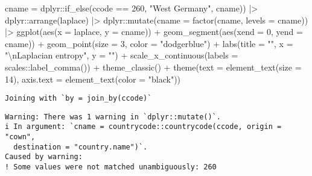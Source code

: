 \documentclass[
  12,
  letterpaper,
  DIV=11,
  numbers=noendperiod]{scrartcl}
\newenvironment{Shaded}{\begin{snugshade}}{\end{snugshade}}
\newcommand{\AttributeTok}[1]{\textcolor[rgb]{0.40,0.45,0.13}{#1}}
\newcommand{\DecValTok}[1]{\textcolor[rgb]{0.68,0.00,0.00}{#1}}
\newcommand{\FunctionTok}[1]{\textcolor[rgb]{0.28,0.35,0.67}{#1}}
\newcommand{\NormalTok}[1]{\textcolor[rgb]{0.00,0.23,0.31}{#1}}
\newcommand{\SpecialCharTok}[1]{\textcolor[rgb]{0.37,0.37,0.37}{#1}}
\newcommand{\StringTok}[1]{\textcolor[rgb]{0.13,0.47,0.30}{#1}}
\begin{document}
\begin{Shaded}
\begin{Highlighting}[numbers=left,,]
                \AttributeTok{cname =}\NormalTok{ dplyr}\SpecialCharTok{::}\FunctionTok{if\_else}\NormalTok{(ccode }\SpecialCharTok{==} \DecValTok{260}\NormalTok{, }\StringTok{"West Germany"}\NormalTok{, cname)) }\SpecialCharTok{|\textgreater{}}
\NormalTok{  dplyr}\SpecialCharTok{::}\FunctionTok{arrange}\NormalTok{(laplace) }\SpecialCharTok{|\textgreater{}}
\NormalTok{  dplyr}\SpecialCharTok{::}\FunctionTok{mutate}\NormalTok{(}\AttributeTok{cname =} \FunctionTok{factor}\NormalTok{(cname, }\AttributeTok{levels =}\NormalTok{ cname)) }\SpecialCharTok{|\textgreater{}}
  \FunctionTok{ggplot}\NormalTok{(}\FunctionTok{aes}\NormalTok{(}\AttributeTok{x =}\NormalTok{ laplace,}
             \AttributeTok{y =}\NormalTok{ cname)) }\SpecialCharTok{+}
  \FunctionTok{geom\_segment}\NormalTok{(}\FunctionTok{aes}\NormalTok{(}\AttributeTok{xend =} \DecValTok{0}\NormalTok{, }\AttributeTok{yend =}\NormalTok{ cname)) }\SpecialCharTok{+}
  \FunctionTok{geom\_point}\NormalTok{(}\AttributeTok{size =} \DecValTok{3}\NormalTok{, }\AttributeTok{color =} \StringTok{"dodgerblue"}\NormalTok{) }\SpecialCharTok{+}
  \FunctionTok{labs}\NormalTok{(}\AttributeTok{title =} \StringTok{""}\NormalTok{,}
       \AttributeTok{x =} \StringTok{"}\SpecialCharTok{\textbackslash{}n}\StringTok{Laplacian entropy"}\NormalTok{,}
       \AttributeTok{y =} \StringTok{""}\NormalTok{) }\SpecialCharTok{+}
  \FunctionTok{scale\_x\_continuous}\NormalTok{(}\AttributeTok{labels =}\NormalTok{ scales}\SpecialCharTok{::}\FunctionTok{label\_comma}\NormalTok{()) }\SpecialCharTok{+}
  \FunctionTok{theme\_classic}\NormalTok{() }\SpecialCharTok{+}
  \FunctionTok{theme}\NormalTok{(}\AttributeTok{text =} \FunctionTok{element\_text}\NormalTok{(}\AttributeTok{size =} \DecValTok{14}\NormalTok{),}
        \AttributeTok{axis.text =} \FunctionTok{element\_text}\NormalTok{(}\AttributeTok{color =} \StringTok{"black"}\NormalTok{))}
\end{Highlighting}
\end{Shaded}

\begin{verbatim}
Joining with `by = join_by(ccode)`
\end{verbatim}

\begin{verbatim}
Warning: There was 1 warning in `dplyr::mutate()`.
i In argument: `cname = countrycode::countrycode(ccode, origin = "cown",
  destination = "country.name")`.
Caused by warning:
! Some values were not matched unambiguously: 260
\end{verbatim}
\end{document}
